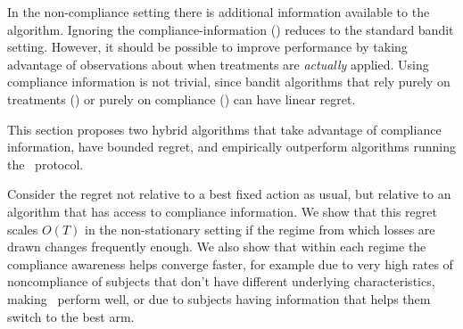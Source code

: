



In the non-compliance setting there is additional information available to the algorithm. Ignoring the compliance-information (\chosen) reduces to the standard bandit setting. However, it should be possible to improve performance by taking advantage of observations about when treatments are \emph{actually} applied. Using compliance information is not trivial, since bandit algorithms that rely purely on treatments (\actual) or purely on compliance (\comply) can have linear regret.

This section proposes two hybrid algorithms that take advantage of compliance information, have bounded regret, and empirically outperform algorithms running the \chosen\, protocol.


Consider the regret not relative to a best fixed action as usual, but relative to an algorithm that has access to compliance information.
We show that this regret scales $O(T)$ in the non-stationary setting if the regime from which losses are drawn changes frequently enough. We also show that within each regime the compliance awareness helps converge faster, for example due to very high rates of noncompliance of subjects that don't have different underlying characteristics, making \actual\, perform well, or due to subjects having information that helps them switch to the best arm.


